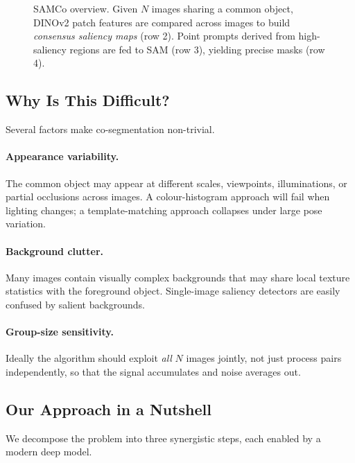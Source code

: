 \documentclass[10pt,twocolumn,letterpaper]{article}
\begin{document}
\begin{figure}[t]
\centering
\fbox{\rule{0pt}{3.5cm}\rule{7cm}{0pt}}
\caption{SAMCo overview. Given $N$ images sharing a common object,
DINOv2 patch features are compared across images to build
\emph{consensus saliency maps} (row 2). Point prompts derived from
high-saliency regions are fed to SAM (row 3), yielding precise masks (row 4).}
\label{fig:teaser}
\end{figure}

\subsection{Why Is This Difficult?}
Several factors make co-segmentation non-trivial.

\paragraph{Appearance variability.}
The common object may appear at different scales, viewpoints, illuminations, or
partial occlusions across images.
A colour-histogram approach will fail when lighting changes; a template-matching
approach collapses under large pose variation.

\paragraph{Background clutter.}
Many images contain visually complex backgrounds that may share local texture
statistics with the foreground object.
Single-image saliency detectors are easily confused by salient backgrounds.

\paragraph{Group-size sensitivity.}
Ideally the algorithm should exploit \emph{all} $N$ images jointly, not just
process pairs independently, so that the signal accumulates and noise averages out.

\subsection{Our Approach in a Nutshell}
We decompose the problem into three synergistic steps, each enabled by a modern
deep model.
\end{document}
